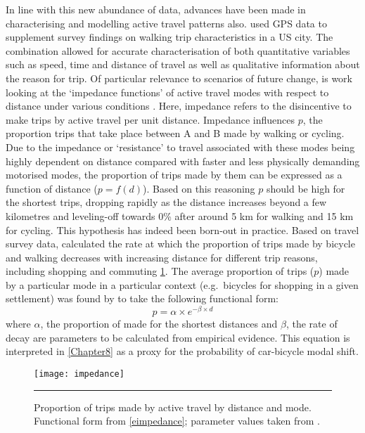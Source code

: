 In line with this new abundance of data, advances have been made in
characterising and 
modelling active travel patterns also. \citet{Millward2013} used GPS
data to supplement survey findings on walking trip characteristics in a US
city. The combination allowed for accurate characterisation of both
quantitative variables such as speed, time and distance of travel as well
as qualitative information about the reason for trip.
Of particular relevance to scenarios of
future change, is work looking at the `impedance functions' of active travel
modes with respect to distance under various conditions \citep{Iacono2010}.
Here, impedance refers to the disincentive to make trips by active travel per
unit distance.
Impedance influences $p$, the proportion trips that
take place between A and B made by walking or cycling. Due to the impedance or 
`resistance' to travel associated with these modes being highly dependent on distance
compared with faster and 
less physically demanding motorised modes, the proportion of trips made by them
can be expressed as a function of distance ($p = f(d)$). Based on this reasoning
$p$ should be high for the shortest
trips, dropping rapidly as the distance increases beyond a few kilometres
and leveling-off towards 0\%  after around 5 km for walking and 15 km for cycling. 
This hypothesis has indeed been born-out in practice.
Based on travel survey data, \citet{Iacono2010} calculated the rate
at which the proportion of trips made by bicycle and walking decreases
with increasing distance for different trip reasons, including shopping and
commuting \cref{fimpedance}.
The average proportion of trips ($p$) made by a particular mode in a particular context
(e.g.~bicycles for shopping in a given settlement) was found by \citet{Iacono2010}
to take the following functional form:
\begin{equation}
 p = \alpha \times e^{- \beta \times d}
 \label{eimpedance}
\end{equation}
where $\alpha$, the proportion of made for the shortest distances
and $\beta$, the rate of decay
are parameters to be calculated from empirical evidence. 
This equation is interpreted in \cref{Chapter8} as a proxy for the probability
of car-bicycle modal shift.


\begin{figure}[htbp]
  \centerline{
    \texttt{[image: impedance]}}
    \rule{35em}{0.5pt}
  \caption[Proportion of trips by active travel by distance and mode]
  {Proportion of trips made by active travel by distance and mode. Functional form
  from \cref{eimpedance}; parameter values taken from \citep{Iacono2010}.}
  \label{fimpedance}
\end{figure}

